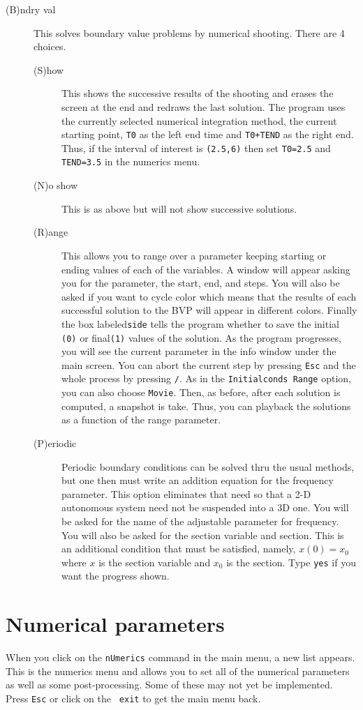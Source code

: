 \documentclass{article}
\newcommand{\tc}[1]{\addcontentsline{toc}{subsection}{#1}}
\begin{document}
\begin{description}
\tc{Boundary values}\item[(B)ndry val]  This solves boundary value problems by numerical shooting. There
 are 4 choices.
\begin{description}
\item[(S)how]  This shows the successive results of the shooting and 
erases the screen at the end and redraws the last solution.  The program
 uses the currently selected numerical integration method, the current starting
 point, {\tt T0} as the left end time and  {\tt T0+TEND} as the right
end. 
 Thus, if the
 interval of interest is {\tt (2.5,6)} then set {\tt T0=2.5} and {\tt
TEND=3.5} in the numerics menu.  
\item[(N)o show] This is as above but will not show successive solutions.
\item[(R)ange]  This allows you to range over a parameter keeping starting or
 ending values of each of the variables.  A window will appear asking you for
 the parameter, the start, end, and steps.  You will also be asked if you want 
to cycle color which means that the results of each successful solution to the
 BVP will appear in different colors. Finally the box labeled{\tt  side} tells the
 program whether to save the initial {\tt (0)} or final{\tt (1)}
values of 
the solution. 
 As the program progresses, you will see the current parameter in the info
 window under the main screen.  You can abort the current step by
pressing
 {\tt Esc} 
and the whole process by pressing {\tt /}. As in the {\tt Initialconds
Range} option, you can also choose {\tt Movie}.  Then, as before,
after each solution is computed, a snapshot is take.  Thus, you can
playback the solutions as a function of the range parameter.

\item[(P)eriodic] Periodic boundary conditions can be solved thru the
usual methods, but one then must write an addition equation for the
frequency parameter.  This option eliminates that need so that a 2-D
autonomous system need not be suspended into a 3D one.  You will be
asked for the name of the adjustable parameter for frequency.  You
will also be asked for the section variable and section.  This is an additional
condition that must be satisfied, namely, $x(0)=x_0$ where $x$ is the
section variable and $x_0$ is the section.  Type {\tt yes} if you want
the progress shown.  
\end{description}
\end{description}


\section{Numerical parameters}
When you click on the {\tt nUmerics} command in the main menu, a new
list appears.  This is the numerics menu and allows you to set all of
the numerical parameters as well as some post-processing.  Some of
these may not yet be implemented. Press {\tt Esc} or click on the {\tt
exit} to get the main menu back.
\end{document}
